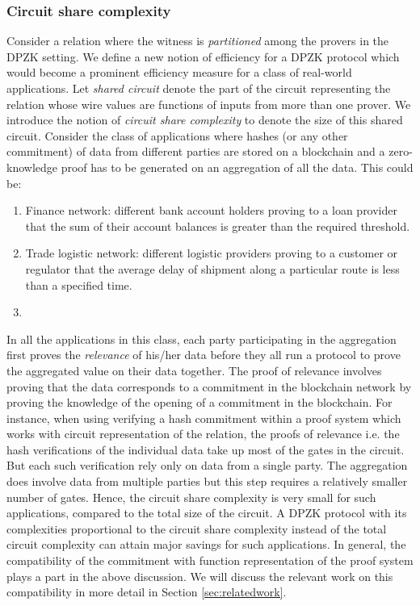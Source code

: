 \subsubsection{Circuit share complexity}
Consider a relation where the witness is \textit{partitioned} among the provers in the DPZK setting. We define a new notion of efficiency for a DPZK protocol which would become a prominent efficiency measure for a class of real-world applications.
Let \textit{shared circuit} denote the part of the circuit representing the relation whose wire values are functions of inputs from more than one prover. 
We introduce the notion of \textit{circuit share complexity} to denote the size of this shared circuit.
Consider the class of applications where hashes (or any other commitment) of data from different parties are stored on a blockchain and a zero-knowledge proof has to be generated on an aggregation of all the data. This could be: 
\begin{enumerate}
\item Finance network: different bank account holders proving to a loan provider that the sum of their account balances is greater than the required threshold.
\item Trade logistic network: different logistic providers proving to a customer or regulator that the average delay of shipment along a particular route is less than a specified time.
\item 
\end{enumerate}
In all the applications in this class, each party participating in the aggregation first proves the \textit{relevance} of his/her data before they all run a protocol to prove the aggregated value on their data together. The proof of relevance involves proving that the data corresponds to a commitment in the blockchain network by proving the knowledge of the opening of a commitment in the blockchain. 
For instance, when using verifying a hash commitment within a proof system which works with circuit representation of the relation, the proofs of relevance i.e. the hash verifications of the individual data take up most of the gates in the circuit. But each such verification rely only on data from a single party. The aggregation does involve data from multiple parties but this step requires a relatively smaller number of gates. Hence, the circuit share complexity is very small for such applications, compared to the total size of the circuit. A DPZK protocol with its complexities proportional to the circuit share complexity instead of the total circuit complexity can attain major savings for such applications.
In general, the compatibility of the commitment with function representation of the proof system plays a part in the above discussion. We will discuss the relevant work on this compatibility in more detail in Section \ref{sec:relatedwork}.

